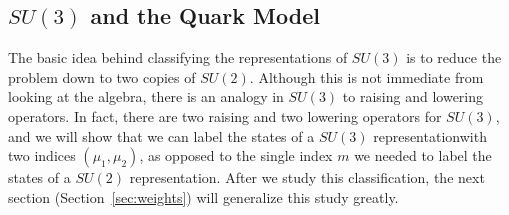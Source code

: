 \documentclass[11pt, oneside]{article}   	%
\theoremstyle{definition}
\begin{document}
\subsection{$SU(3)$ and the Quark Model}

The basic idea behind classifying the representations of $SU(3)$ is to reduce the problem down to two copies of $SU(2)$. 
Although this is not immediate from looking at the algebra, there is an analogy in $SU(3)$ to raising and lowering operators. 
In fact, there are two raising and two lowering operators for $SU(3)$, and we will show that we can label the states of 
a $SU(3)$ representationwith two indices $(\mu_1, \mu_2)$, as opposed to the single index $m$ we needed to label the 
states of a $SU(2)$ representation. After we study this classification, the next section (Section~\ref{sec:weights}) will 
generalize this study greatly.
\end{document}

